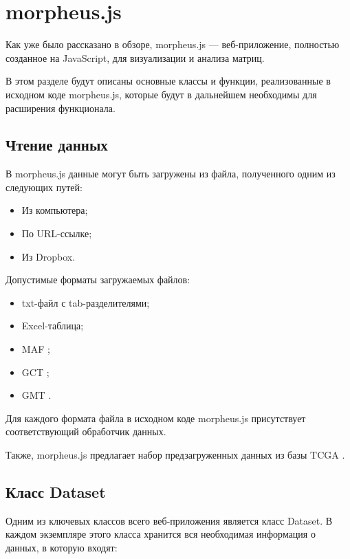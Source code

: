 \documentclass[annotation,specification]{itmo-student-thesis}
\begin{document}
\section{morpheus.js}
Как уже было рассказано в обзоре, morpheus.js --- веб-приложение, полностью созданное на JavaScript, для визуализации и анализа матриц.

В этом разделе будут описаны основные классы и функции, реализованные в исходном коде morpheus.js, которые будут в дальнейшем необходимы для расширения функционала.

\subsection{Чтение данных}
В morpheus.js данные могут быть загружены из файла, полученного одним из следующих путей:
\begin{itemize}
\item Из компьютера;
\item По URL-ссылке;
\item Из Dropbox.
\end{itemize}

Допустимые форматы загружаемых файлов:
\begin{itemize}
\item txt-файл с tab-разделителями;
\item Excel-таблица;
\item MAF \cite{maf};
\item GCT \cite{gct};
\item GMT \cite{gmt}.
\end{itemize}

Для каждого формата файла в исходном коде morpheus.js присутствует соответствующий обработчик данных.

Также, morpheus.js предлагает набор предзагруженных данных из базы TCGA \cite{tcga}.

\subsection{Класс Dataset}
Одним из ключевых классов всего веб-приложения является класс Dataset. В каждом экземпляре этого класса хранится вся необходимая информация о данных, в которую входят:
\end{document}
